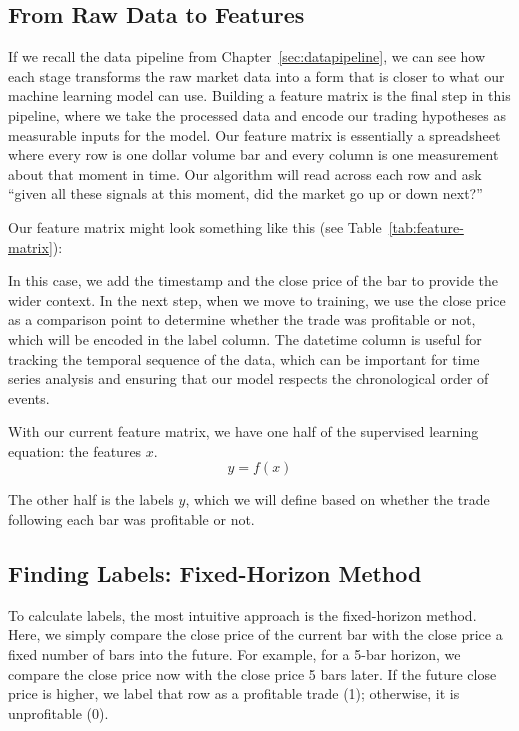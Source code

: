 \subsection{From Raw Data to Features}



If we recall the data pipeline from Chapter~\ref{sec:datapipeline}, we can see how each stage transforms the raw market data into a form that is closer to what our machine learning model can use. 
Building a feature matrix is the final step in this pipeline, where we take the processed data and encode our trading hypotheses as measurable inputs for the model. 
Our feature matrix is essentially a spreadsheet where every row is one dollar volume bar and every column is one measurement about that moment in time. 
Our algorithm will read across each row and ask ``given all these signals at this moment, did the market go up or down next?''

Our feature matrix might look something like this (see Table~\ref{tab:feature-matrix}):



In this case, we add the timestamp and the close price of the bar to provide the wider context. 
In the next step, when we move to training, we use the close price as a comparison point to determine whether the trade was profitable or not, which will be encoded in the label column. 
The datetime column is useful for tracking the temporal sequence of the data, which can be important for time series analysis and ensuring that our model respects the chronological order of events.

With our current feature matrix, we have one half of the supervised learning equation: the features $x$.
\[
y = f(x)
\]

The other half is the labels $y$, which we will define based on whether the trade following each bar was profitable or not.


\subsection{Finding Labels: Fixed-Horizon Method}

To calculate labels, the most intuitive approach is the fixed-horizon method.
Here, we simply compare the close price of the current bar with the close price a fixed number of bars into the future. 
For example, for a 5-bar horizon, we compare the close price now with the close price 5 bars later. 
If the future close price is higher, we label that row as a profitable trade (1); otherwise, it is unprofitable (0).

